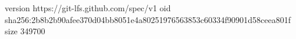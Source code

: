 version https://git-lfs.github.com/spec/v1
oid sha256:2b8b2b90afee370d04bb8051e4a80251976563853c60334f90901d58ceea801f
size 349700
